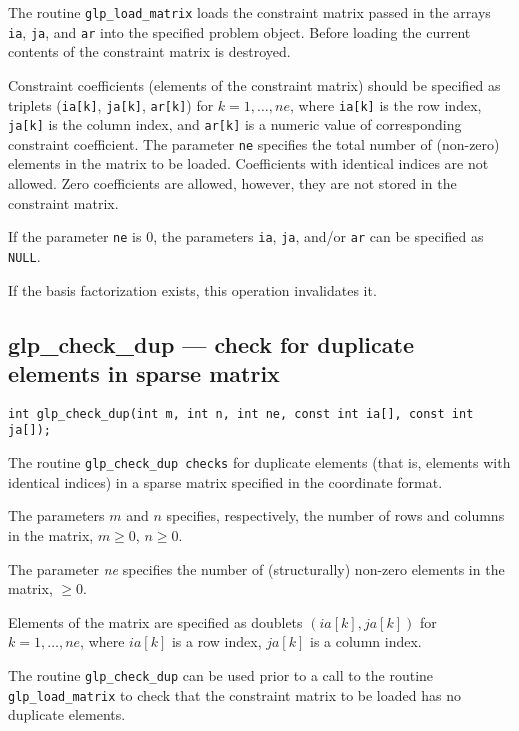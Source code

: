 \description

The routine \verb|glp_load_matrix| loads the constraint matrix passed
in  the arrays \verb|ia|, \verb|ja|, and \verb|ar| into the specified
problem object. Before loading the current contents of the constraint
matrix is destroyed.

Constraint coefficients (elements of the constraint matrix) should be
specified as triplets (\verb|ia[k]|, \verb|ja[k]|, \verb|ar[k]|) for
$k=1,\dots,ne$, where \verb|ia[k]| is the row index, \verb|ja[k]| is
the column index, and \verb|ar[k]| is a numeric value of corresponding
constraint coefficient. The parameter \verb|ne| specifies the total
number of (non-zero) elements in the matrix to be loaded. Coefficients
with identical indices are not allowed. Zero coefficients are allowed,
however, they are not stored in the constraint matrix.

If the parameter \verb|ne| is 0, the parameters \verb|ia|, \verb|ja|,
and/or \verb|ar| can be specified as \verb|NULL|.

\note

If the basis factorization exists, this operation invalidates it.

\subsection{glp\_check\_dup --- check for duplicate elements in sparse
matrix}

\synopsis

{\tt int glp\_check\_dup(int m, int n, int ne, const int ia[],
const int ja[]);}

\description

The routine \verb|glp_check_dup checks| for duplicate elements (that
is, elements with identical indices) in a sparse matrix specified in
the coordinate format.

The parameters $m$ and $n$ specifies, respectively, the number of rows
and columns in the matrix, $m\geq 0$, $n\geq 0$.

The parameter {\it ne} specifies the number of (structurally) non-zero
elements in the matrix, $\geq 0$.

Elements of the matrix are specified as doublets $(ia[k],ja[k])$ for
$k=1,\dots,ne$, where $ia[k]$ is a row index, $ja[k]$ is a column
index.

The routine \verb|glp_check_dup| can be used prior to a call to the
routine \verb|glp_load_matrix| to check that the constraint matrix to
be loaded has no duplicate elements.

